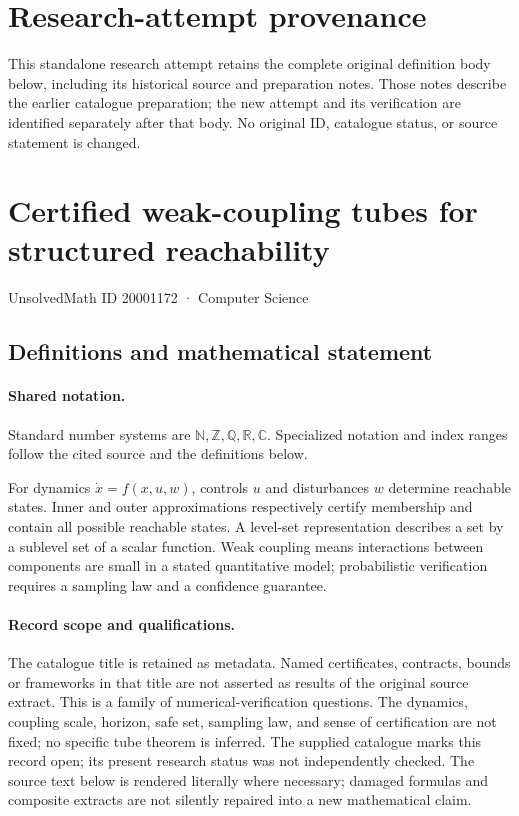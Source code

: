 \documentclass[11pt]{article}
\begin{document}
\section*{Research-attempt provenance}
This standalone research attempt retains the complete original definition body below,
including its historical source and preparation notes. Those notes describe the
earlier catalogue preparation; the new attempt and its verification are identified
separately after that body. No original ID, catalogue status, or source statement is changed.

\section{Certified weak-coupling tubes for structured reachability}\label{20001172}
{\small UnsolvedMath ID 20001172 · Computer Science}
\subsection{Definitions and mathematical statement}

\paragraph{Shared notation.}Standard number systems are $\mathbb N,\mathbb Z,\mathbb Q,\mathbb R,\mathbb C$. Specialized notation and index ranges follow the cited source and the definitions below.


For dynamics $\dot x=f(x,u,w)$, controls $u$ and disturbances $w$ determine reachable states. Inner and outer approximations respectively certify membership and contain all possible reachable states. A level-set representation describes a set by a sublevel set of a scalar function. Weak coupling means interactions between components are small in a stated quantitative model; probabilistic verification requires a sampling law and a confidence guarantee.
\paragraph{Record scope and qualifications.}
The catalogue title is retained as metadata. Named certificates, contracts, bounds or frameworks in that title are not asserted as results of the original source extract.
This is a family of numerical-verification questions. The dynamics, coupling scale, horizon, safe set, sampling law, and sense of certification are not fixed; no specific tube theorem is inferred. The supplied catalogue marks this record open; its present research status was not independently checked.
The source text below is rendered literally where necessary; damaged formulas and composite extracts are not silently repaired into a new mathematical claim.
\end{document}
